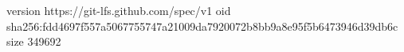 version https://git-lfs.github.com/spec/v1
oid sha256:fdd4697f557a5067755747a21009da7920072b8bb9a8e95f5b6473946d39db6c
size 349692
